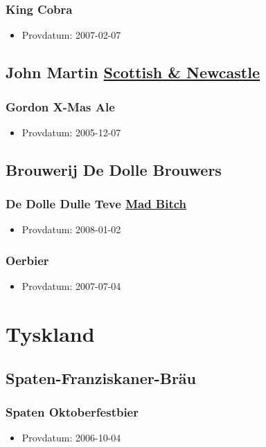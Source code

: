 \documentclass[11pt]{article}
\begin{document}
\subsubsection{King Cobra}
\label{sec:orgce7ea9b}
\begin{itemize}
\item Provdatum: 2007-02-07
\end{itemize}
\subsection{John Martin \underline{Scottish \& Newcastle}}
\label{sec:org12bc797}
\subsubsection{Gordon X-Mas Ale}
\label{sec:org4942895}
\begin{itemize}
\item Provdatum: 2005-12-07
\end{itemize}
\subsection{Brouwerij De Dolle Brouwers}
\label{sec:org5955356}
\subsubsection{De Dolle Dulle Teve \underline{Mad Bitch}}
\label{sec:org9329fd7}
\begin{itemize}
\item Provdatum: 2008-01-02
\end{itemize}
\subsubsection{Oerbier}
\label{sec:org3f1410f}
\begin{itemize}
\item Provdatum: 2007-07-04
\end{itemize}
\section{Tyskland}
\label{sec:org0187f3f}
\subsection{Spaten-Franziskaner-Bräu}
\label{sec:org1a4ea14}
\subsubsection{Spaten Oktoberfestbier}
\label{sec:org51ed095}
\begin{itemize}
\item Provdatum: 2006-10-04
\end{itemize}
\end{document}
